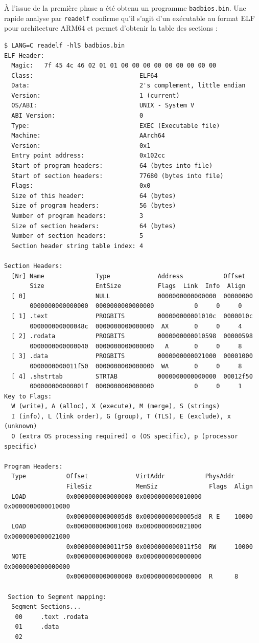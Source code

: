 \documentclass[a4paper,10pt]{article}
\begin{document}
À l'issue de la première phase a été obtenu un programme \texttt{badbios.bin}. Une rapide analyse par \texttt{readelf} confirme qu'il s'agit d'un exécutable au format ELF pour architecture ARM64 et permet d'obtenir la table des sections :
\begin{verbatim}
$ LANG=C readelf -hlS badbios.bin
ELF Header:
  Magic:   7f 45 4c 46 02 01 01 00 00 00 00 00 00 00 00 00
  Class:                             ELF64
  Data:                              2's complement, little endian
  Version:                           1 (current)
  OS/ABI:                            UNIX - System V
  ABI Version:                       0
  Type:                              EXEC (Executable file)
  Machine:                           AArch64
  Version:                           0x1
  Entry point address:               0x102cc
  Start of program headers:          64 (bytes into file)
  Start of section headers:          77680 (bytes into file)
  Flags:                             0x0
  Size of this header:               64 (bytes)
  Size of program headers:           56 (bytes)
  Number of program headers:         3
  Size of section headers:           64 (bytes)
  Number of section headers:         5
  Section header string table index: 4

Section Headers:
  [Nr] Name              Type             Address           Offset
       Size              EntSize          Flags  Link  Info  Align
  [ 0]                   NULL             0000000000000000  00000000
       0000000000000000  0000000000000000           0     0     0
  [ 1] .text             PROGBITS         000000000001010c  0000010c
       000000000000048c  0000000000000000  AX       0     0     4
  [ 2] .rodata           PROGBITS         0000000000010598  00000598
       0000000000000040  0000000000000000   A       0     0     8
  [ 3] .data             PROGBITS         0000000000021000  00001000
       0000000000011f50  0000000000000000  WA       0     0     8
  [ 4] .shstrtab         STRTAB           0000000000000000  00012f50
       000000000000001f  0000000000000000           0     0     1
Key to Flags:
  W (write), A (alloc), X (execute), M (merge), S (strings)
  I (info), L (link order), G (group), T (TLS), E (exclude), x (unknown)
  O (extra OS processing required) o (OS specific), p (processor specific)

Program Headers:
  Type           Offset             VirtAddr           PhysAddr
                 FileSiz            MemSiz              Flags  Align
  LOAD           0x0000000000000000 0x0000000000010000 0x0000000000010000
                 0x00000000000005d8 0x00000000000005d8  R E    10000
  LOAD           0x0000000000001000 0x0000000000021000 0x0000000000021000
                 0x0000000000011f50 0x0000000000011f50  RW     10000
  NOTE           0x0000000000000000 0x0000000000000000 0x0000000000000000
                 0x0000000000000000 0x0000000000000000  R      8

 Section to Segment mapping:
  Segment Sections...
   00     .text .rodata
   01     .data
   02
\end{verbatim}
\end{document}
